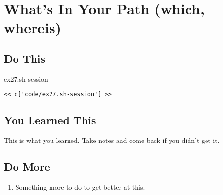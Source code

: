 \chapter{What's In Your Path (which, whereis)}

\section{Do This}

\begin{code}{ex27.sh-session}
\begin{Verbatim}
<< d['code/ex27.sh-session'] >>
\end{Verbatim}
\end{code}


\section{You Learned This}

This is what you learned.  Take notes and come back if you didn't get it.

\section{Do More}

\begin{enumerate}
\item Something more to do to get better at this.
\end{enumerate}

